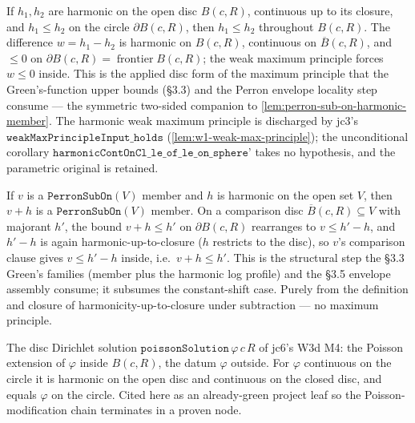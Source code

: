 \begin{lemma}
\label{lem:harmonic-disc-comparison}
If \(h_1, h_2\) are harmonic on the open disc \(B(c,R)\), continuous up to
its closure, and \(h_1 \le h_2\) on the circle \(\partial B(c,R)\), then
\(h_1 \le h_2\) throughout \(B(c,R)\).  The difference \(w = h_1 - h_2\) is
harmonic on \(B(c,R)\), continuous on \(\overline{B}(c,R)\), and \(\le 0\)
on \(\partial B(c,R) = \operatorname{frontier} B(c,R)\); the weak maximum
principle forces \(w \le 0\) inside.  This is the applied disc form of the
maximum principle that the Green's-function upper bounds (§3.3) and the
Perron envelope locality step consume — the symmetric two-sided companion
to \ref{lem:perron-sub-on-harmonic-member}.  The harmonic weak maximum
principle is discharged by jc3's \(\texttt{weakMaxPrincipleInput\_holds}\)
(\ref{lem:w1-weak-max-principle}); the unconditional corollary
\(\texttt{harmonicContOnCl\_le\_of\_le\_on\_sphere'}\) takes no hypothesis,
and the parametric original is retained.
\leanok
\end{lemma}

\begin{lemma}
\label{lem:perron-sub-on-add-harmonic}
If \(v\) is a \(\texttt{PerronSubOn}(V)\) member and \(h\) is harmonic on
the open set \(V\), then \(v + h\) is a \(\texttt{PerronSubOn}(V)\) member.
On a comparison disc \(\overline{B}(c,R) \subseteq V\) with majorant
\(h'\), the bound \(v + h \le h'\) on \(\partial B(c,R)\) rearranges to
\(v \le h' - h\), and \(h' - h\) is again harmonic-up-to-closure (\(h\)
restricts to the disc), so \(v\)'s comparison clause gives \(v \le h' - h\)
inside, i.e.\ \(v + h \le h'\).  This is the structural step the §3.3
Green's families (member plus the harmonic log profile) and the §3.5
envelope assembly consume; it subsumes the constant-shift case.  Purely
from the definition and closure of harmonicity-up-to-closure under
subtraction — no maximum principle.
\leanok
\end{lemma}

\begin{lemma}
\label{lem:m4-poisson-solution}
The disc Dirichlet solution \(\texttt{poissonSolution}\,\varphi\,c\,R\) of
jc6's W3d M4: the Poisson extension of \(\varphi\) inside \(B(c,R)\), the
datum \(\varphi\) outside.  For \(\varphi\) continuous on the circle it is
harmonic on the open disc and continuous on the closed disc, and equals
\(\varphi\) on the circle.  Cited here as an already-green project leaf so
the Poisson-modification chain terminates in a proven node.
\leanok
\end{lemma}

